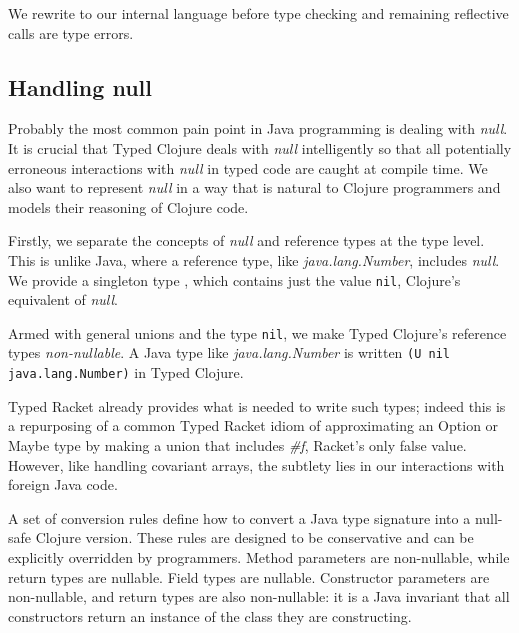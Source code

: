 We rewrite to our internal language before type checking and remaining reflective calls are type errors.

\subsection{Handling null}
\label{sec:null}

Probably the most common pain point in Java programming is dealing with \emph{null}.
It is crucial that Typed Clojure deals with \emph{null} intelligently so that
all potentially erroneous interactions with \emph{null} in typed code are caught at compile time.
We also want to represent \emph{null} in a way that is natural to Clojure programmers
and models their reasoning of Clojure code.

Firstly, we separate the concepts of \emph{null} and reference types at the type level.
This is unlike Java, where a reference type, like \emph{java.lang.Number}, includes \emph{null}.
We provide a singleton type \Nil{}, which contains just the value \lstinline|nil|,
Clojure's equivalent of \emph{null}. 

Armed with general unions and the type \lstinline|nil|, 
we make Typed Clojure's reference types \emph{non-nullable}.
A Java type like \emph{java.lang.Number} is written \lstinline|(U nil java.lang.Number)|
in Typed Clojure.

Typed Racket already provides what is needed to write such types; indeed this is a repurposing
of a common Typed Racket idiom of approximating an Option or Maybe type by
making a union that includes \emph{\#f}, Racket's only false value.
However, like handling covariant arrays, the subtlety lies in our interactions with foreign
Java code.

A set of conversion rules define how to convert a Java type signature into a null-safe
Clojure version. These rules are designed to be conservative and can be explicitly overridden
by programmers. Method parameters are non-nullable, while return types are nullable.
Field types are nullable. Constructor parameters are non-nullable, and return types
are also non-nullable: it is a Java invariant that all constructors return an instance
of the class they are constructing.




